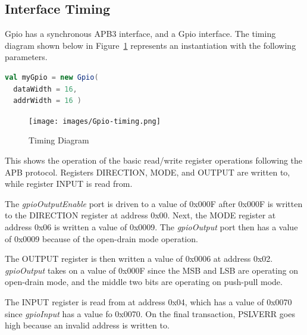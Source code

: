 

\newpage
\subsection{Interface Timing}

Gpio has a synchronous APB3 interface, and a Gpio interface. The timing diagram shown below
in Figure~\ref{fig:timing} represents an instantiation with the following
parameters.

\begin{lstlisting}[language=Scala]
val myGpio = new Gpio(
  dataWidth = 16, 
  addrWidth = 16 ) 
\end{lstlisting}

\begin{figure}[h]
  \texttt{[image: images/Gpio-timing.png]}
  \caption{Timing Diagram}\label{fig:timing}
\end{figure}

This shows the operation of the basic read/write register operations following the APB protocol. Registers DIRECTION, MODE, and OUTPUT are
written to, while register INPUT is read from.

The \textit{gpioOutputEnable} port is driven to a value of 0x000F after 0x000F is written to the DIRECTION register 
at address 0x00. Next, the MODE register at address 0x06 is written a value of 0x0009. The \textit{gpioOutput} port 
then has a value of 0x0009 because of the open-drain mode operation. 

The OUTPUT register is then written a value of 0x0006 at address 0x02. \textit{gpioOutput} takes on a value of 0x000F
since the MSB and LSB are operating on open-drain mode, and the middle two bits are operating on push-pull mode. 

The INPUT register is read from at address 0x04, which has a value of 0x0070 since \textit{gpioInput} has a value fo 0x0070.
On the final transaction, PSLVERR goes high because an invalid address is written to.
